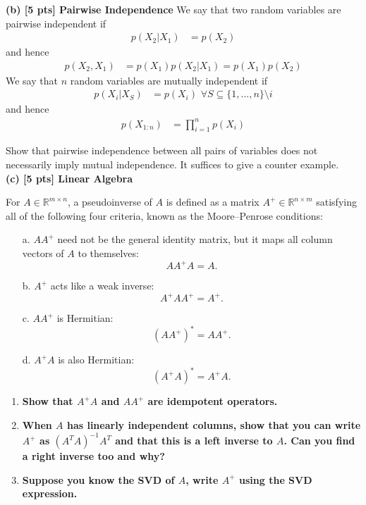 \documentclass[twoside,10pt]{article}
\begin{document}
\noindent\textbf{(b) [5 pts] Pairwise Independence}
We say that two random variables are pairwise independent if
\begin{align}
    p(X_2|X_1) &= p(X_2) 
\end{align}
and hence
\begin{align}
    p(X_2, X_1) &= p(X_1)p(X_2|X_1) = p(X_1)p(X_2)
\end{align}
We say that $n$ random variables are mutually independent if
\begin{align}
    p(X_i|X_S) &= p(X_i) \,\, \forall S \subseteq \{1, . . . , n\} \setminus  {i} 
\end{align}
and hence
\begin{align}
p(X_{1:n}) &= \prod_{i = 1}^n p(X_i)
\end{align}

Show that pairwise independence between all pairs of variables does not necessarily imply mutual independence.
It suffices to give a counter example. \\


\noindent\textbf{(c) [5 pts] Linear Algebra}

For \( A \in \mathbb{R}^{m \times n} \), a pseudoinverse of \( A \) is defined as a matrix \( A^+ \in \mathbb{R}^{n \times m} \) satisfying all of the following four criteria, known as the Moore–Penrose conditions:

\begin{enumerate}
    \item[a.] \( AA^+ \) need not be the general identity matrix, but it maps all column vectors of \( A \) to themselves:
    \[
    AA^+A = A.
    \]
    
    \item[b.] \( A^+ \) acts like a weak inverse:
    \[
    A^+AA^+ = A^+.
    \]
    
    \item[c.] \( AA^+ \) is Hermitian:
    \[
    (AA^+)^* = AA^+.
    \]
    
    \item[d.] \( A^+A \) is also Hermitian:
    \[
    (A^+A)^* = A^+A.
    \]
\end{enumerate}
\begin{enumerate}
    \item \textbf{Show that \( A^+A \) and \( AA^+ \) are idempotent operators.}

    \item \textbf{When \( A \) has linearly independent columns, show that you can write \( A^+ \) as \( (A^T A)^{-1} A^T \) and that this is a left inverse to \( A \). Can you find a right inverse too and why?}
    
    \item \textbf{Suppose you know the SVD of \( A \), write \( A^+ \) using the SVD expression.}
\end{enumerate}
\end{document}
